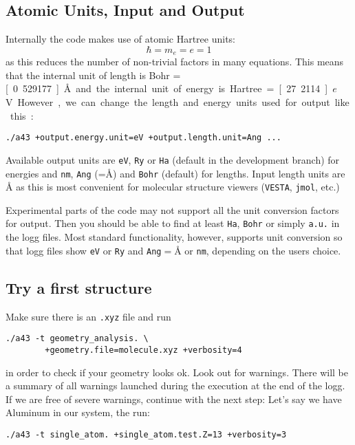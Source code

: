 \documentclass[oribibl]{llncs}
\newcommand{\ttt}[1]{\texttt{#1}}
\begin{document}
\subsection{Atomic Units, Input and Output}
Internally the code makes use of atomic Hartree units:
\begin{equation}
	\hbar = m_e = e = 1
\end{equation}
as this reduces the number of non-trivial factors in many equations.
This means that the internal unit of length is Bohr = \unit[0.529177]{\AA{}}
and the internal unit of energy is Hartree = \unit[27.2114]{$e$V}.
However, we can change the length and energy units used for output like this:
\begin{verbatim}
./a43 +output.energy.unit=eV +output.length.unit=Ang ...
\end{verbatim}
Available output units are \ttt{eV}, \ttt{Ry} or \ttt{Ha} (default in the development branch) for energies and \ttt{nm}, \ttt{Ang} (=\AA) and \ttt{Bohr} (default) for lengths.
Input length units are \AA{} as this is most convenient for molecular structure viewers
(\ttt{VESTA}, \ttt{jmol}, etc.)

Experimental parts of the code may not support all the unit conversion
factors for output. Then you should be able to find at least \ttt{Ha}, \ttt{Bohr} or simply \ttt{a.u.} in the logg files.
Most standard functionality, however, supports unit conversion so that logg files
show \ttt{eV} or \ttt{Ry} and \ttt{Ang}$ = $\AA{} or \ttt{nm}, depending on the users choice.



\subsection{Try a first structure}
Make sure there is an \ttt{.xyz} file and run
\begin{verbatim}
./a43 -t geometry_analysis. \
        +geometry.file=molecule.xyz +verbosity=4
\end{verbatim}
in order to check if your geometry looks ok. Look out for warnings.
There will be a summary of all warnings launched during the execution at the end of the logg.
If we are free of severe warnings, continue with the next step:
Let's say we have Aluminum in our system, the run:
\begin{verbatim}
./a43 -t single_atom. +single_atom.test.Z=13 +verbosity=3
\end{verbatim}
\end{document}
